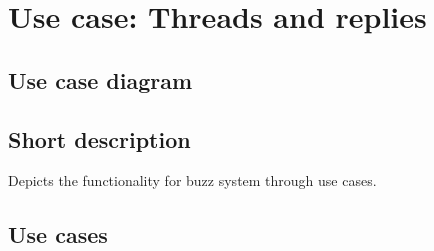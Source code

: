 \documentclass{article}
\begin{document}
\section{Use case: Threads and replies}
	\subsection{Use case diagram}
	\subsection{Short description}
	\begin{description}
		\item[Depicts the functionality for buzz system through use cases.] 
	\end{description}
	\subsection{Use cases}
\end{document}
